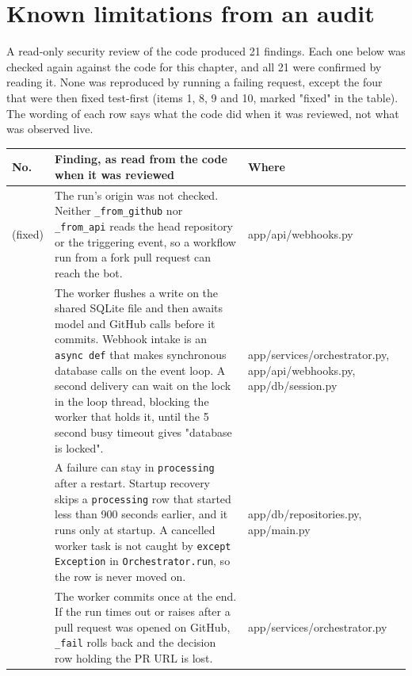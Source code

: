 \documentclass[11pt,a4paper]{report}
\begin{document}
\section{Known limitations from an audit}

A read-only security review of the code produced 21 findings. Each one below was checked again against the code for this chapter, and all 21 were confirmed by reading it. None was reproduced by running a failing request, except the four that were then fixed test-first (items 1, 8, 9 and 10, marked "fixed" in the table). The wording of each row says what the code did when it was reviewed, not what was observed live.

\begin{longtable}{>{\raggedright\arraybackslash}p{0.077\dimexpr\linewidth-6\tabcolsep\relax}>{\raggedright\arraybackslash}p{0.462\dimexpr\linewidth-6\tabcolsep\relax}>{\raggedright\arraybackslash}p{0.462\dimexpr\linewidth-6\tabcolsep\relax}}
\toprule
\textbf{No.} & \textbf{Finding, as read from the code when it was reviewed} & \textbf{Where} \\
\midrule
\endhead
1 (fixed) & The run's origin was not checked. Neither \texttt{\_\allowbreak{}from\_\allowbreak{}github} nor \texttt{\_\allowbreak{}from\_\allowbreak{}api} reads the head repository or the triggering event, so a workflow run from a fork pull request can reach the bot. & app/api/webhooks.py \\
2 & The worker flushes a write on the shared SQLite file and then awaits model and GitHub calls before it commits. Webhook intake is an \texttt{async def} that makes synchronous database calls on the event loop. A second delivery can wait on the lock in the loop thread, blocking the worker that holds it, until the 5 second busy timeout gives "database is locked". & app/services/orchestrator.py, app/api/webhooks.py, app/db/session.py \\
3 & A failure can stay in \texttt{processing} after a restart. Startup recovery skips a \texttt{processing} row that started less than 900 seconds earlier, and it runs only at startup. A cancelled worker task is not caught by \texttt{except Exception} in \texttt{Orchestrator.\allowbreak{}run}, so the row is never moved on. & app/db/repositories.py, app/main.py \\
4 & The worker commits once at the end. If the run times out or raises after a pull request was opened on GitHub, \texttt{\_\allowbreak{}fail} rolls back and the decision row holding the PR URL is lost. & app/services/orchestrator.py \\

\end{longtable}
\end{document}
